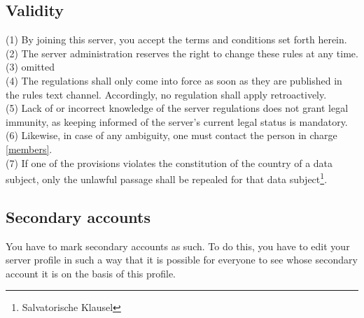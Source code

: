 \documentclass{article}
\begin{document}
\subsection{Validity}
(1) By joining this server, you accept the terms and conditions set forth herein.\\
(2) The server administration reserves the right to change these rules at any time.\\
(3) omitted\\
(4) The regulations shall only come into force as soon as they are published in the rules text channel. Accordingly, no regulation shall apply retroactively.\\
(5) Lack of or incorrect knowledge of the server regulations does not grant legal immunity, as keeping informed of the server's current legal status is mandatory.\\
(6) Likewise, in case of any ambiguity, one must contact the person in charge \ref{members}.\\
(7) If one of the provisions violates the constitution of the country of a data subject, only the unlawful passage shall be repealed for that data subject\footnote{Salvatorische Klausel}.

\subsection{Secondary accounts}
You have to mark secondary accounts as such. To do this, you have to edit your server profile in such a way that it is possible for everyone to see whose secondary account it is on the basis of this profile.
\end{document}
